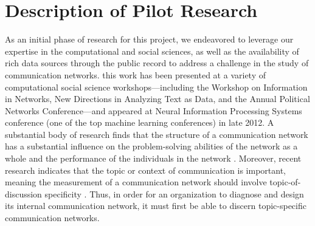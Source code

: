 \section{Description of Pilot Research}

As an initial phase of research for this project, we endeavored to leverage our expertise in the computational and social sciences, as well as the availability of rich data sources through the public record to address a challenge in the study of communication networks. this work has been presented at a variety of computational social science workshops---including the Workshop on Information in Networks, New Directions in Analyzing Text as Data, and the Annual Political Networks Conference---and appeared at Neural Information Processing Systems conference (one of the top machine learning conferences) in late 2012. A substantial body of research finds that the structure of a communication network has a substantial influence on the problem-solving abilities of the network as a whole and the performance of the individuals in the network \cite{Mason2012}. Moreover, recent research indicates that the topic or context of communication is important, meaning the measurement of a communication network should involve topic-of-discussion specificity \cite{Mason2008}. Thus, in order for an organization to diagnose and design its internal communication network, it must first be able to discern topic-specific communication networks.

